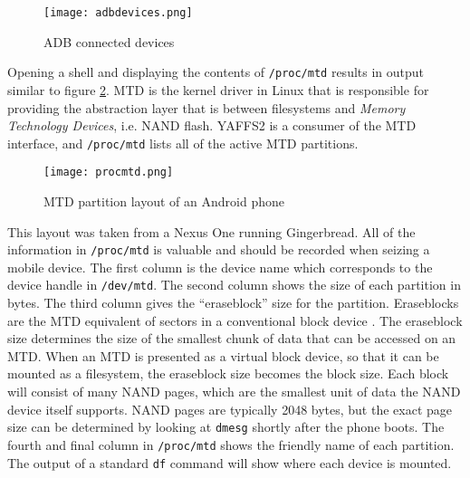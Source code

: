 \begin{figure}[htpb]
\caption{ADB connected devices}
\begin{center}\texttt{[image: adbdevices.png]}\end{center}
\label{fig:adbdevices}
\end{figure}

Opening a shell and displaying the contents of \texttt{/proc/mtd} results in output similar to figure \ref{fig:mtd}.  MTD is the
kernel driver in Linux that is responsible for providing the abstraction layer that is between filesystems and \emph{Memory
Technology Devices}, i.e. NAND flash. YAFFS2 is a consumer of the MTD interface, and \texttt{/proc/mtd} lists all of the active MTD
partitions. 

\begin{figure}[htpb]
\caption{MTD partition layout of an Android phone}
\begin{center}\texttt{[image: procmtd.png]}\end{center}
\label{fig:mtd}
\end{figure}	

This layout was taken from a Nexus One running Gingerbread.  All of the information in \texttt{/proc/mtd} is valuable and should be
recorded when seizing a mobile device. The first column is the device name which corresponds to the device handle in
\texttt{/dev/mtd}.  The second column shows the size of each partition in bytes. 
The third column gives the ``eraseblock'' size for the partition.  Eraseblocks are the MTD equivalent of sectors in a conventional block
device \cite{mtdfaq}. The eraseblock size determines the size of the smallest chunk of data that can be accessed on an MTD.  When an MTD
is presented as a virtual block device, so that it can be mounted as a filesystem, the eraseblock size becomes the block size.  Each
block will consist of many NAND pages, which are the smallest unit of data the NAND device itself supports.  NAND pages are
typically 2048 bytes, but the exact page size can be determined by looking at \texttt{dmesg} shortly after the phone boots.  The
fourth and final column in \texttt{/proc/mtd} shows the friendly name of each partition.  The output of a standard \texttt{df}
command will show where each device is mounted.

